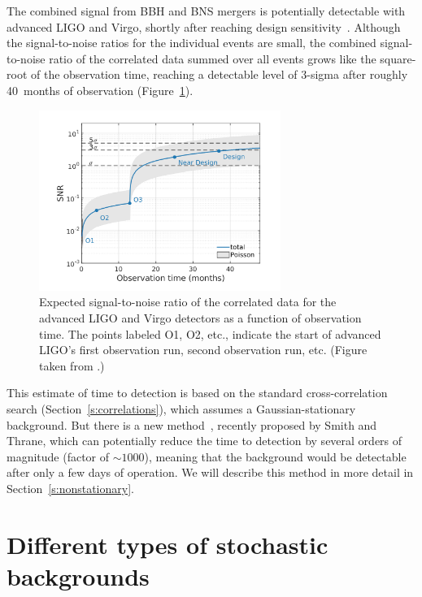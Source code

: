 The combined signal from BBH and BNS mergers is 
potentially detectable with advanced LIGO and Virgo, 
shortly after reaching design sensitivity~\cite{StochImplications:2018}.
Although the signal-to-noise ratios for the 
individual events are small, the combined 
signal-to-noise ratio of the correlated data 
summed over all events grows like the square-root 
of the observation time, reaching a detectable
level of $3$-sigma after roughly 40~months of
observation (Figure~\ref{f:BBH-BNS-SNR}).
%
\begin{figure}[htbp!]
\begin{center}
\includegraphics[width=0.7\textwidth]{Figures/BBH-BNS-SNR}
\caption{Expected signal-to-noise ratio of the correlated
data for the advanced LIGO and Virgo detectors as a function 
of observation time.
The points labeled O1, O2, etc., indicate the start of
advanced LIGO's first observation run, second observation
run, etc. 
(Figure taken from \cite{StochImplications:2018}.)}
\label{f:BBH-BNS-SNR}
\end{center}
\end{figure}
%
This estimate of time to detection is based on 
the standard cross-correlation search (Section~\ref{s:correlations}), 
which assumes a Gaussian-stationary background.
But there is a new method~\cite{Smith-Thrane:2018}, 
recently proposed by Smith and Thrane,
which can potentially reduce the time to detection by several 
orders of magnitude (factor of $\sim\!1000$), 
meaning that the background would be detectable after only
a few days of operation. 
We will describe this method in more detail in 
Section~\ref{s:nonstationary}.

\section{Different types of stochastic backgrounds}
\label{s:different_types}

